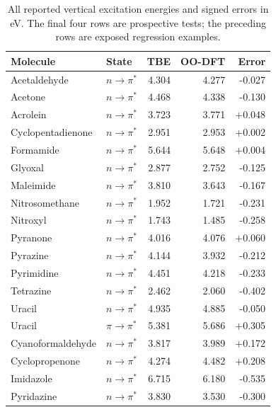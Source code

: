 \begin{table}[!htbp]
\centering\small
\caption{All reported vertical excitation energies and signed errors in eV. The final four rows are prospective tests; the preceding rows are exposed regression examples.}\label{tab:allvertical}
\begin{tabular}{llrrr}
\toprule
Molecule & State & TBE & OO-DFT & Error \\
\midrule
Acetaldehyde & $n\rightarrow\pi^*$ & 4.304 & 4.277 & -0.027 \\
Acetone & $n\rightarrow\pi^*$ & 4.468 & 4.338 & -0.130 \\
Acrolein & $n\rightarrow\pi^*$ & 3.723 & 3.771 & +0.048 \\
Cyclopentadienone & $n\rightarrow\pi^*$ & 2.951 & 2.953 & +0.002 \\
Formamide & $n\rightarrow\pi^*$ & 5.644 & 5.648 & +0.004 \\
Glyoxal & $n\rightarrow\pi^*$ & 2.877 & 2.752 & -0.125 \\
Maleimide & $n\rightarrow\pi^*$ & 3.810 & 3.643 & -0.167 \\
Nitrosomethane & $n\rightarrow\pi^*$ & 1.952 & 1.721 & -0.231 \\
Nitroxyl & $n\rightarrow\pi^*$ & 1.743 & 1.485 & -0.258 \\
Pyranone & $n\rightarrow\pi^*$ & 4.016 & 4.076 & +0.060 \\
Pyrazine & $n\rightarrow\pi^*$ & 4.144 & 3.932 & -0.212 \\
Pyrimidine & $n\rightarrow\pi^*$ & 4.451 & 4.218 & -0.233 \\
Tetrazine & $n\rightarrow\pi^*$ & 2.462 & 2.060 & -0.402 \\
Uracil & $n\rightarrow\pi^*$ & 4.935 & 4.885 & -0.050 \\
Uracil & $\pi\rightarrow\pi^*$ & 5.381 & 5.686 & +0.305 \\
Cyanoformaldehyde & $n\rightarrow\pi^*$ & 3.817 & 3.989 & +0.172 \\
Cyclopropenone & $n\rightarrow\pi^*$ & 4.274 & 4.482 & +0.208 \\
Imidazole & $n\rightarrow\pi^*$ & 6.715 & 6.180 & -0.535 \\
Pyridazine & $n\rightarrow\pi^*$ & 3.830 & 3.530 & -0.300 \\
\bottomrule
\end{tabular}
\end{table}

